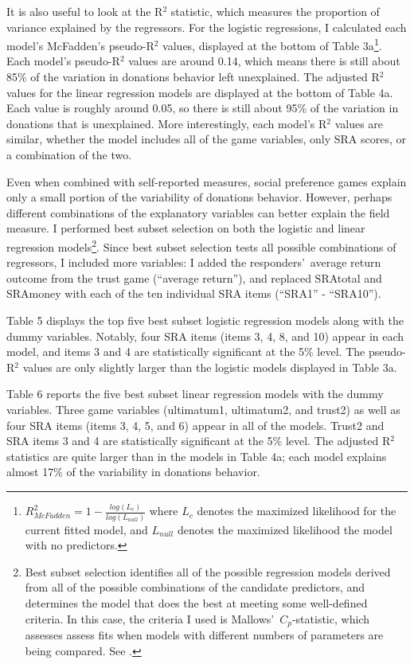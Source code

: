 \documentclass[12pt]{article}
\begin{document}
It is also useful to look at the R$^{2}$ statistic, which measures the proportion of variance explained by the regressors. For the logistic regressions, I calculated each model\rq s McFadden\rq s pseudo-R$^{2}$ values, displayed at the bottom of Table 3a\footnote{
\(R^{2}_{McFadden} = 1 - \frac{log(L_{c})}{log(L_{null})}\)
where \(L_{c}\) denotes the maximized likelihood for the current fitted model, and \(L_{null}\) denotes the maximized likelihood the model with no predictors.
}. Each model\rq s pseudo-R$^{2}$ values are around 0.14, which means there is still about 85\% of the variation in donations behavior left unexplained. The adjusted R$^{2}$ values for the linear regression models are displayed at the bottom of Table 4a. Each value is roughly around 0.05, so there is still about 95\% of the variation in donations that is unexplained. More interestingly, each model\rq s R$^{2}$ values are similar, whether the model includes all of the game variables, only SRA scores, or a combination of the two.

Even when combined with self-reported measures, social preference games explain only a small portion of the variability of donations behavior. However, perhaps different combinations of the explanatory variables can better explain the field measure. I performed best subset selection on both the logistic and linear regression models\footnote{Best subset selection identifies all of the possible regression models derived from all of the possible combinations of the candidate predictors, and determines the model that does the best at meeting some well-defined criteria. In this case, the criteria I used is Mallows\rq \ \(C_{p}\)-statistic, which assesses assess fits when models with different numbers of parameters are being compared.  See \cite{mallows_1973}.}. Since best subset selection tests all possible combinations of regressors, I included more variables: I added the responders\rq \ average return outcome from the trust game (``average return''), and replaced SRAtotal and SRAmoney with each of the ten individual SRA items (``SRA1'' - ``SRA10''). 

Table 5 displays the top five best subset logistic regression models along with the dummy variables. Notably, four SRA items (items 3, 4, 8, and 10) appear in each model, and items 3 and 4 are statistically significant at the 5\% level. The pseudo-R$^{2}$ values are only slightly larger than the logistic models displayed in Table 3a.

Table 6 reports the five best subset linear regression models with the dummy variables. Three game variables (ultimatum1, ultimatum2, and trust2) as well as four SRA items (items 3, 4, 5, and 6) appear in all of the models. Trust2 and SRA items 3 and 4 are statistically significant at the 5\% level. The adjusted R$^{2}$ statistics are quite larger than in the models in Table 4a; each model explains almost 17\% of the variability in donations behavior. 
\end{document}
